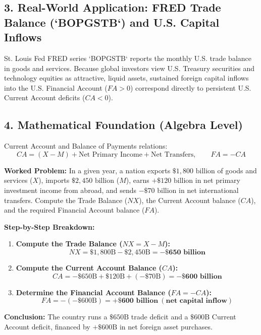 \documentclass[11pt,letterpaper]{article}
\begin{document}
\subsection*{3. Real-World Application: FRED Trade Balance (`BOPGSTB`) and U.S. Capital Inflows}
St. Louis Fed FRED series `BOPGSTB` reports the monthly U.S. trade balance in goods and services. Because global investors view U.S. Treasury securities and technology equities as attractive, liquid assets, sustained foreign capital inflows into the U.S. Financial Account ($FA > 0$) correspond directly to persistent U.S. Current Account deficits ($CA < 0$).

\subsection*{4. Mathematical Foundation (Algebra Level)}
Current Account and Balance of Payments relations:
\begin{equation}
CA = (X - M) + \text{Net Primary Income} + \text{Net Transfers}, \qquad FA = -CA
\end{equation}

\noindent\textbf{Worked Problem:}
In a given year, a nation exports $\$1{,}800\text{ billion}$ of goods and services ($X$), imports $\$2{,}450\text{ billion}$ ($M$), earns $+\$120\text{ billion}$ in net primary investment income from abroad, and sends $-\$70\text{ billion}$ in net international transfers. Compute the Trade Balance ($NX$), the Current Account balance ($CA$), and the required Financial Account balance ($FA$).

\noindent\textbf{Step-by-Step Breakdown:}
\begin{enumerate}
    \item \textbf{Compute the Trade Balance ($NX = X - M$):}
    \[
    NX = \$1{,}800\text{B} - \$2{,}450\text{B} = \mathbf{-\$650\text{ billion}}
    \]

    \item \textbf{Compute the Current Account Balance ($CA$):}
    \[
    CA = -\$650\text{B} + \$120\text{B} + (-\$70\text{B}) = \mathbf{-\$600\text{ billion}}
    \]

    \item \textbf{Determine the Financial Account Balance ($FA = -CA$):}
    \[
    FA = -(-\$600\text{B}) = \mathbf{+\$600\text{ billion}\ (\text{net capital inflow})}
    \]
\end{enumerate}
\textbf{Conclusion:} The country runs a $\$650\text{B}$ trade deficit and a $\$600\text{B}$ Current Account deficit, financed by $+\$600\text{B}$ in net foreign asset purchases.
\end{document}
